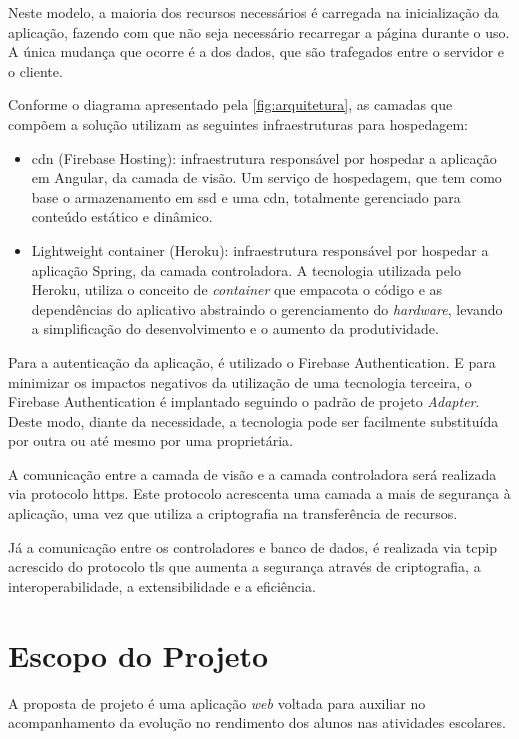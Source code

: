 \documentclass[
    12pt,               %
    openright,          %
    oneside,
    a4paper,            %
    english,            %
    brazil              %
    ]{ifsp-spo-inf-ctds} %
\begin{document}
Neste modelo, a maioria dos recursos necessários é carregada na inicialização da aplicação, fazendo com que não seja necessário recarregar a página durante o uso. A única mudança que ocorre é a dos dados, que são trafegados entre o servidor e o cliente.


Conforme o diagrama apresentado pela \autoref{fig:arquitetura}, as camadas que compõem a solução utilizam as seguintes infraestruturas para hospedagem:
\begin{itemize}
\item \ac{cdn} (Firebase Hosting): infraestrutura responsável por hospedar a aplicação em Angular, da camada de visão. Um serviço de hospedagem, que tem como base o armazenamento em \ac{ssd} e uma \ac{cdn}, totalmente gerenciado para conteúdo estático e dinâmico.
\item  Lightweight container (Heroku): infraestrutura responsável por hospedar a aplicação Spring, da camada controladora. A tecnologia utilizada pelo Heroku, utiliza o conceito de \textit{\gls{container}} que empacota o código e as dependências do aplicativo abstraindo o gerenciamento do \textit{\gls{hardware}}, levando a simplificação do desenvolvimento e o aumento da produtividade.
\end{itemize}

Para a autenticação da aplicação, é utilizado o Firebase Authentication. E para minimizar os impactos negativos da utilização de uma tecnologia terceira, o Firebase Authentication é implantado seguindo o padrão de projeto \textit{Adapter}. Deste modo, diante da necessidade, a tecnologia pode ser facilmente substituída por outra ou até mesmo por uma proprietária.


A comunicação entre a camada de visão e a camada controladora será realizada via protocolo \ac{https}. Este protocolo acrescenta uma camada a mais de segurança à aplicação, uma vez que utiliza a criptografia na transferência de recursos.


Já a comunicação entre os controladores e banco de dados, é realizada via \ac{tcpip} acrescido do protocolo \ac{tls} que aumenta a segurança através de criptografia, a interoperabilidade, a extensibilidade e a eficiência.




\section{Escopo do Projeto}
A proposta de projeto é uma aplicação \textit{web} voltada para auxiliar no acompanhamento da evolução no rendimento dos alunos nas atividades escolares.
\end{document}

